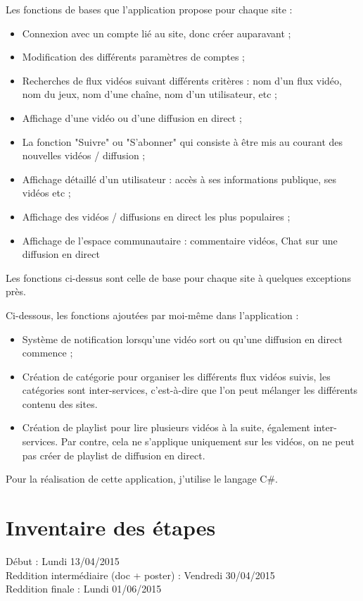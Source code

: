 \documentclass[11pt]{report} %
\begin{document}
	Les fonctions de bases que l’application propose pour chaque site :
	\begin{itemize}
		\item Connexion avec un compte lié au site, donc créer auparavant ;
		\item Modification des différents paramètres de comptes ;
		\item Recherches de flux vidéos suivant différents critères : nom d’un flux vidéo, nom du jeux, nom d’une chaîne, nom d’un utilisateur, etc ;
		\item Affichage d’une vidéo ou d’une diffusion en direct ;
		\item La fonction "Suivre" ou "S’abonner" qui consiste à être mis au courant des nouvelles vidéos / diffusion ;
		\item Affichage détaillé d’un utilisateur : accès à ses informations publique, ses vidéos etc ;
		\item Affichage des vidéos / diffusions en direct les plus populaires ;
		\item Affichage de l’espace communautaire : commentaire vidéos, Chat sur une diffusion en direct
	\end{itemize}
	
	Les fonctions ci-dessus sont celle de base pour chaque site à quelques exceptions près.
	
	Ci-dessous, les fonctions ajoutées par moi-même dans l’application :
	\begin{itemize}
		\item Système de notification lorsqu’une vidéo sort ou qu’une diffusion en direct commence ;
		\item Création de catégorie pour organiser les différents flux vidéos suivis, les catégories sont inter-services, c'est-à-dire que l’on peut mélanger les différents contenu des sites.
		\item Création de playlist pour lire plusieurs vidéos à la suite, également inter-services. Par contre, cela ne s'applique uniquement sur les vidéos, on ne peut pas créer de playlist de diffusion en direct.
	\end{itemize}

	Pour la réalisation de cette application, j’utilise le langage C\#.

	\section{Inventaire des étapes}
	Début : Lundi 13/04/2015 \\
	Reddition intermédiaire (doc + poster) : Vendredi 30/04/2015 \\
	Reddition finale : Lundi 01/06/2015
	
\end{document}
